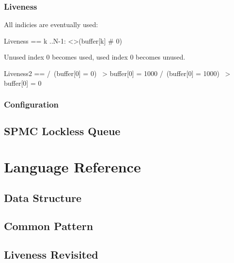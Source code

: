 \documentclass{report}
\begin{document}
\section{Liveness}

All indicies are eventually used:

\begin{tla}
    Liveness ==
    \A k ..N-1:
    <>(buffer[k] # 0)
\end{tla}
\begin{tlatex}
%
%
%
\end{tlatex}

Unused index 0 becomes used, used index 0 becomes unused.
\begin{tla}
    Liveness2 ==
    /\ (buffer[0] = 0) ~> buffer[0] = 1000
    /\ (buffer[0] = 1000) ~> buffer[0] = 0
\end{tla}
\begin{tlatex}
%
\end{tlatex}

\section{Configuration}

\chapter{SPMC Lockless Queue}



\part{Language Reference}

\chapter{Data Structure}

\chapter{Common Pattern}

\chapter{Liveness Revisited}
\end{document}
